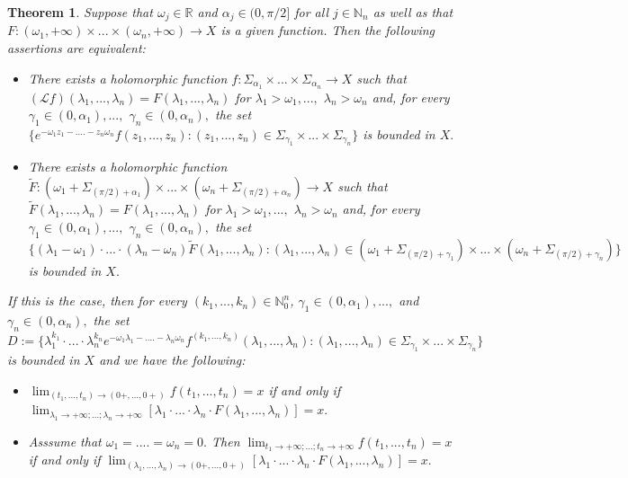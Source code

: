 \documentclass{amsart}
\newtheorem{thm}{Theorem}[section]
\theoremstyle{definition}
\theoremstyle{remark}
\numberwithin{equation}{section}
\begin{document}
\begin{thm}\label{analytic}
Suppose that $\omega_{j}\in {\mathbb R}$ and $\alpha_{j}\in (0,\pi/2]$ for all $j\in {\mathbb N}_{n}$ as well as that $F: (\omega_{1},+\infty) \times ... \times (\omega_{n},+\infty)\rightarrow X$ is a given function. Then the following assertions are equivalent:
\begin{itemize}
\item[(i)] There exists a holomorphic function $f : \Sigma_{\alpha_{1}}\times ... \times \Sigma_{\alpha_{n}}\rightarrow X$ such that $({\mathcal L}f) (\lambda_{1},...,\lambda_{n}) =F(\lambda_{1},...,\lambda_{n})  $ for $\lambda_{1}>\omega_{1}, ...,$ $\lambda_{n}>\omega_{n}$ and, for every $\gamma_{1}\in (0,\alpha_{1}), ...,$ $ \gamma_{n}\in (0,\alpha_{n}),$ the set $\{ e^{-\omega_{1}z_{1}-....-z_{n}\omega_{n}}f(z_{1},...,z_{n}) : (z_{1},...,z_{n})\in \Sigma_{\gamma_{1}} \times ... \times \Sigma_{\gamma_{n}} \}$ is bounded in $X.$
\item[(ii)] There exists a holomorphic function $\tilde{F} : (\omega_{1}+\Sigma_{(\pi/2)+\alpha_{1}}) \times ... \times (\omega_{n}+\Sigma_{(\pi/2)+\alpha_{n}})\rightarrow X$ such that $\tilde{F}(\lambda_{1},...,\lambda_{n})  =F(\lambda_{1},...,\lambda_{n})  $ for $\lambda_{1}>\omega_{1}, ...,$ $\lambda_{n}>\omega_{n}$ and, for every $\gamma_{1}\in (0,\alpha_{1}), ...,$ $ \gamma_{n}\in (0,\alpha_{n}),$ the set $\{(\lambda_{1}-\omega_{1})\cdot ... \cdot (\lambda_{n}-\omega_{n})\tilde{F}(\lambda_{1},...,\lambda_{n})  : (\lambda_{1},...,\lambda_{n})\in (\omega_{1}+\Sigma_{(\pi/2)+\gamma_{1}}) \times ... \times (\omega_{n}+\Sigma_{(\pi/2)+\gamma_{n}}) \}$ is bounded in $X.$
\end{itemize}
If this is the case, then for every $(k_{1},...,k_{n})\in {\mathbb N}_{0}^{n}$, $\gamma_{1}\in (0,\alpha_{1}), ...,$ and $ \gamma_{n}\in (0,\alpha_{n}),$ the set $D:=\{\lambda_{1}^{k_{1}}\cdot ... \cdot \lambda_{n}^{k_{n}}e^{-\omega_{1}\lambda_{1}-....-\lambda_{n}\omega_{n}}f^{(k_{1},...,k_{n})} (\lambda_{1},...,\lambda_{n}) : (\lambda_{1},...,\lambda_{n})\in \Sigma_{\gamma_{1}} \times ... \times \Sigma_{\gamma_{n}}\}$  is bounded in $X$ and we have the following:
\begin{itemize}
\item[(a)] $\lim_{(t_{1},...,t_{n})\rightarrow (0+,...,0+)}f(t_{1},...,t_{n})=x$ if and only if $\lim_{\lambda_{1}\rightarrow +\infty;...;\lambda_{n}\rightarrow +\infty}[\lambda_{1}\cdot ... \cdot \lambda_{n}\cdot F(\lambda_{1},...,\lambda_{n})]=x.$
\item[(b)] Asssume that $\omega_{1}=....=\omega_{n}=0.$ Then $\lim_{t_{1}\rightarrow +\infty;...;t_{n}\rightarrow +\infty}f(t_{1},...,t_{n})=x$ if and only if $\lim_{(\lambda_{1},...,\lambda_{n})\rightarrow (0+,...,0+)}[\lambda_{1}\cdot ... \cdot \lambda_{n} \cdot F(\lambda_{1},...,\lambda_{n})]=x.$ 
\end{itemize}
\end{thm}
\end{document}
